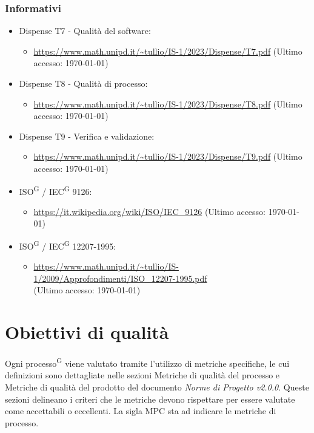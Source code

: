 \documentclass[8pt]{article}
\newcommand{\glossterm}[1]{#1\textsuperscript{G}} %
\begin{document}
\subsubsection{Informativi}
\begin{itemize}
	\item Dispense T7 - Qualità del software:
	\begin{itemize}
		\item \href{https://www.math.unipd.it/~tullio/IS-1/2023/Dispense/T7.pdf}{\color{myblue}https://www.math.unipd.it/\textasciitilde{}tullio/IS-1/2023/Dispense/T7.pdf} (Ultimo accesso: \today)
	\end{itemize}
	\item Dispense T8 - Qualità di processo:
	\begin{itemize}
		\item \href{https://www.math.unipd.it/~tullio/IS-1/2023/Dispense/T8.pdf}{\color{myblue}https://www.math.unipd.it/\textasciitilde{}tullio/IS-1/2023/Dispense/T8.pdf} (Ultimo accesso: \today)
	\end{itemize}
	\item Dispense T9 - Verifica e validazione:
	\begin{itemize}
		\item \href{https://www.math.unipd.it/~tullio/IS-1/2023/Dispense/T9.pdf}{\color{myblue}https://www.math.unipd.it/\textasciitilde{}tullio/IS-1/2023/Dispense/T9.pdf} (Ultimo accesso: \today)
	\end{itemize}
	\item \glossterm{ISO} / \glossterm{IEC} 9126:
	\begin{itemize}
		\item \href{https://it.wikipedia.org/wiki/ISO/IEC_9126}{\color{myblue}https://it.wikipedia.org/wiki/ISO/IEC\_9126} (Ultimo accesso: \today)
	\end{itemize}
	\item \glossterm{ISO} / \glossterm{IEC} 12207-1995:
	\begin{itemize}
		\item \href{https://www.math.unipd.it/~tullio/IS-1/2009/Approfondimenti/ISO_12207-1995.pdf}{\color{myblue}https://www.math.unipd.it/\textasciitilde{}tullio/IS-1/2009/Approfondimenti/ISO\_12207-1995.pdf} \\ (Ultimo accesso: \today)
	\end{itemize}
\end{itemize}
\clearpage
\section{Obiettivi di qualità}\label{sec:obiettivi qualita}
Ogni \glossterm{processo} viene valutato tramite l'utilizzo di metriche specifiche, le cui definizioni sono dettagliate nelle sezioni Metriche di qualità del processo e Metriche di qualità del prodotto del documento \textit{Norme di Progetto v2.0.0}. Queste sezioni delineano i criteri che le metriche devono rispettare per essere valutate come accettabili o eccellenti. La sigla MPC sta ad indicare le metriche di processo.
\end{document}
